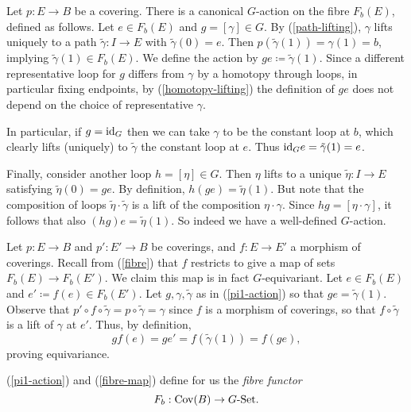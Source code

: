 \begin{nothing}
  \label{pi1-action}
  Let $p : E \to B$ be a covering. There is a canonical $G$-action on
  the fibre $F_b(E)$, defined as follows. Let $e \in F_b(E)$ and $g =
  [\gamma] \in G$. By (\ref{path-lifting}), $\gamma$ lifts uniquely to
  a path $\tilde\gamma : I \to E$ with $\tilde\gamma(0) = e$. Then
  $p(\tilde\gamma(1)) = \gamma(1) = b$, implying $\tilde\gamma(1) \in
  F_b(E)$. We define the action by $ge \coloneqq
  \tilde\gamma(1)$. Since a different representative loop for $g$
  differs from $\gamma$ by a homotopy through loops, in particular
  fixing endpoints, by (\ref{homotopy-lifting}) the definition of $ge$
  does not depend on the choice of representative $\gamma$.

  In particular, if $g = \mathrm{id}_G$ then we can take $\gamma$ to be the
  constant loop at $b$, which clearly lifts (uniquely) to
  $\tilde\gamma$ the constant loop at $e$. Thus $\mathrm{id}_G e =
  \tilde\gamma(1) = e$.

  Finally, consider another loop $h = [\eta] \in G$. Then $\eta$ lifts
  to a unique $\tilde\eta : I \to E$ satisfying $\tilde\eta(0) =
  ge$. By definition, $h(ge) = \tilde\eta(1)$. But note that the
  composition of loops $\tilde\eta \cdot \tilde\gamma$ is a lift of
  the composition $\eta \cdot \gamma$. Since $hg = [\eta \cdot
    \gamma]$, it follows that also $(hg)e = \tilde\eta(1)$. So indeed
  we have a well-defined $G$-action.
\end{nothing}

\begin{nothing}
  \label{fibre-map}
  Let $p : E \to B$ and $p' : E' \to B$ be coverings, and $f : E \to
  E'$ a morphism of coverings. Recall from (\ref{fibre}) that $f$
  restricts to give a map of sets $F_b(E) \to F_b(E')$. We claim this
  map is in fact $G$-equivariant. Let $e \in F_b(E)$ and $e' \coloneqq
  f(e) \in F_b(E')$. Let $g,\gamma,\tilde\gamma$ as in
  (\ref{pi1-action}) so that $ge = \tilde\gamma(1)$. Observe that $p'
  \circ f \circ \tilde\gamma = p \circ \tilde \gamma = \gamma$ since
  $f$ is a morphism of coverings, so that $f \circ \tilde\gamma$ is a
  lift of $\gamma$ at $e'$. Thus, by definition,
  \[
  gf(e) = ge' = f(\tilde\gamma(1)) = f(ge),
  \]
  proving equivariance.
\end{nothing}

\begin{definition}
  (\ref{pi1-action}) and (\ref{fibre-map}) define for us the
  \emph{fibre functor}
  \[
  F_b : \operatorname{Cov}(B) \to G\text{-}\mathrm{Set}.
  \]
\end{definition}

